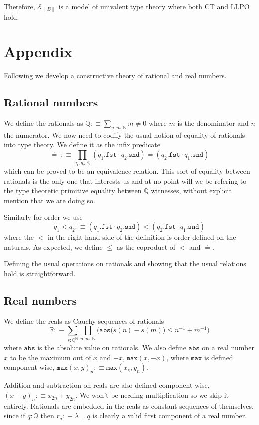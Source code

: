 \documentclass[12pt]{report}
\begin{document}
Therefore, $\mathcal{E}_{\lVert B \rVert}$ is a model of univalent type theory where both CT and LLPO hold.

\chapter*{Appendix}
Following \cite{bridges_richman_1987_2} we develop a constructive theory of rational and real numbers.
\section{Rational numbers}
We define the rationals as $\mathbb{Q} :\equiv \sum_{n,m: \mathbb{N}}m \neq 0$ where $m$ is the denominator and $n$ the numerator. 
We now need to codify the usual notion of equality of rationals into type theory. 
We define it as the infix predicate
$$\doteq\; :\equiv \prod_{q_1, q_2 : \mathbb{Q}} (q_1.\mathtt{fst} \cdot q_2.\mathtt{snd}) = (q_2.\mathtt{fst} \cdot q_1.\mathtt{snd})$$
which can be proved to be an equivalence relation. 
This sort of equality between rationals is the only one that interests us and at no point will we be refering to the type theoretic primitive equality between $\mathbb{Q}$ witnesses, without explicit mention that we are doing so. 

Similarly for order we use 
$$q_1 < q_2 :\equiv (q_1.\mathtt{fst} \cdot q_2.\mathtt{snd}) < (q_2.\mathtt{fst} \cdot q_1.\mathtt{snd})$$ 
where the $<$ in the right hand side of the definition is order defined on the naturals. 
As expected, we define $\leq$ as the coproduct of $<$ and $\doteq$. 

Defining the usual operations on rationals and showing that the usual relations hold is straightforward. 

\section{Real numbers}
We define the reals as Cauchy sequences of rationals
$$\mathbb{R} :\equiv \sum_{s: \mathbb{Q}^\mathbb{N}}\prod_{n,m : \mathbb{N}} \Big( \mathtt{abs}\big(s(n) - s(m) \big) \leq n^{-1} + m^{-1} \Big)$$
where $\mathtt{abs}$ is the absolute value on rationals. 
We also define $\mathtt{abs}$ on a real number $x$ to be the maximum out of $x$ and $-x$, $\mathtt{max}(x,-x)$, where $\mathtt{max}$ is defined component-wise, $\mathtt{max}(x,y)_n :\equiv \mathtt{max}(x_n,y_n)$. 

Addition and subtraction on reals are also defined component-wise, $(x \pm y)_n :\equiv x_{2n} + y_{2n}$. 
We won't be needing multiplication so we skip it entirely. 
Rationals are embedded in the reals as constant sequences of themselves, since if $q : \mathbb{Q}$ then $r_q :\equiv \lambda\;\_.\; q$ is clearly a valid first component of a real number. 
\end{document}
